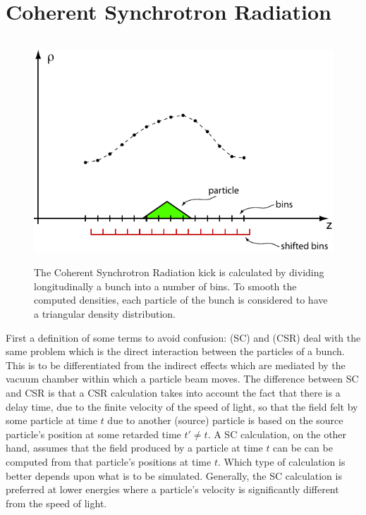\section{Coherent Synchrotron Radiation}
\label{s:csr}   

\begin{figure}[!b]
\centering
\includegraphics[height=8.4cm]{csr-bin.pdf}
\caption[CSR Calculation]
{The Coherent Synchrotron Radiation kick is calculated by dividing
longitudinally a bunch into a number of bins. To smooth the computed
densities, each particle of the bunch is considered to have a
triangular density distribution.}
\label{f:csr.bin}
\end{figure}

First a definition of some terms to avoid confusion:  (SC)
and  (CSR) deal with the same problem
which is the direct interaction between the particles of a bunch. This is
to be differentiated from the indirect  effects which are
mediated by the vacuum chamber within which a particle beam moves. The
difference between SC and CSR is that a CSR calculation takes into account
the fact that there is a delay time, due to the finite velocity of the
speed of light, so that the field felt by some particle at time $t$ due to
another (source) particle is based on the source particle's position at
some retarded time $t' \ne t$. A SC calculation, on the other hand, assumes
that the field produced by a particle at time $t$ can be can be computed
from that particle's positions at time $t$. Which type of calculation is
better depends upon what is to be simulated. Generally, the SC calculation
is preferred at lower energies where a particle's velocity is significantly
different from the speed of light.

